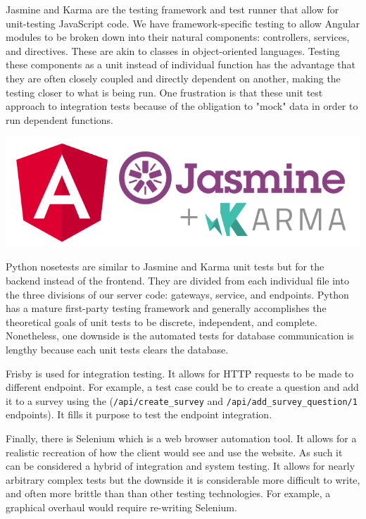 \documentclass[12pt]{report}
\begin{document}
\par\noindent
Jasmine and Karma are the testing framework and test runner that allow for unit-testing JavaScript code. We have framework-specific testing to allow Angular modules to be broken down into their natural components: controllers, services, and directives. These are akin to classes in object-oriented languages. Testing these components as a unit instead of individual function has the advantage that they are often closely coupled and directly dependent on another, making the testing closer to what is being run. One frustration is that these unit test approach to integration tests because of the obligation to "mock" data in order to run dependent functions.

\begin{center}
\includegraphics[scale=0.4]{karma}
\end{center}

\par\noindent
Python nosetests are similar to Jasmine and Karma unit tests but for the backend instead of the frontend. They are divided from each individual file into the three divisions of our server code: gateways, service, and endpoints. Python has a mature first-party testing framework and generally accomplishes the theoretical goals of unit tests to be discrete, independent, and complete. Nonetheless, one downside is the automated tests for database communication is lengthy because each unit tests clears the database.

\par\noindent
Frisby is used for integration testing. It allows for HTTP requests to be made to different endpoint. For example, a test case could be to create a question and add it to a survey using the (\texttt{/api/create\_survey} and \texttt{/api/add\_survey\_question/1} endpoints). It fills it purpose to test the endpoint integration.


\par\noindent
Finally, there is Selenium which is a web browser automation tool. It allows for a realistic recreation of how the client would see and use the website. As such it can be considered a hybrid of integration and system testing. It allows for nearly arbitrary complex tests but the downside it is considerable more difficult to write, and often more brittle than than other testing technologies. For example, a graphical overhaul would require re-writing Selenium.
\end{document}
